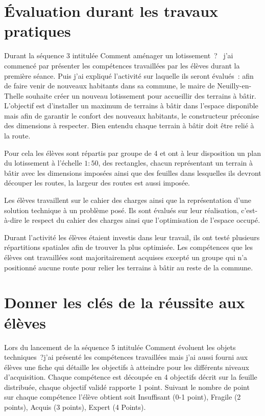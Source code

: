 

\section{Évaluation durant les travaux pratiques}

Durant la séquence 3 intitulée \og Comment aménager un lotissement~? \fg \ j'ai commencé par présenter les compétences travaillées par les élèves durant la première séance.
Puis j'ai expliqué l'activité sur laquelle ils seront évalués~: afin de faire venir de nouveaux habitants dans sa commune, le maire de Neuilly-en-Thelle souhaite créer un nouveau lotissement pour accueillir des terrains à bâtir.
L'objectif est d'installer un maximum de terrains à bâtir dans l'espace disponible mais afin de garantir le confort des nouveaux habitants, le constructeur préconise des dimensions à respecter.
Bien entendu chaque terrain à bâtir doit être relié à la route.

Pour cela les élèves sont répartis par groupe de 4 et ont à leur disposition un plan du lotissement à l'échelle $1:50$, des rectangles, chacun représentant un terrain à bâtir avec les dimensions imposées ainsi que des feuilles dans lesquelles ils devront découper les routes, la largeur des routes est aussi imposée.

Les élèves travaillent sur le cahier des charges ainsi que la représentation d'une solution technique à un problème posé.
Ils sont évalués sur leur réalisation, c'est-à-dire le respect du cahier des charges ainsi que l'optimisation de l'espace occupé.

Durant l'activité les élèves étaient investis dans leur travail, ils ont testé plusieurs répartitions spatiales afin de trouver la plus optimisée.
Les compétences que les élèves ont travaillées sont majoritairement acquises excepté un groupe qui n'a positionné aucune route pour relier les terrains à bâtir au reste de la commune.



\section{Donner les clés de la réussite aux élèves}

Lors du lancement de la séquence 5 intitulée \og Comment évoluent les objets techniques~?\fg j'ai présenté les compétences travaillées mais j'ai aussi fourni aux élèves une fiche qui détaille les objectifs à atteindre pour les différents niveaux d'acquisition. 
Chaque compétence est découpée en 4 objectifs décrit sur la feuille distribuée, chaque objectif validé rapporte 1 point. Suivant le nombre de point sur chaque compétence l'élève obtient soit Insuffisant (0-1 point), Fragile (2 points), Acquis (3 points), Expert (4 Points).

